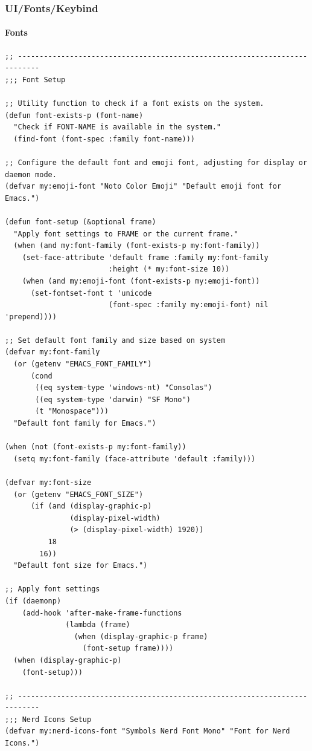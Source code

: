 \documentclass[11pt]{article}
\begin{document}
\subsubsection{UI/Fonts/Keybind}
\label{sec:orgcd0a7b3}
\paragraph{Fonts}
\label{sec:org087ad90}

\begin{verbatim}
;; ---------------------------------------------------------------------------
;;; Font Setup

;; Utility function to check if a font exists on the system.
(defun font-exists-p (font-name)
  "Check if FONT-NAME is available in the system."
  (find-font (font-spec :family font-name)))

;; Configure the default font and emoji font, adjusting for display or daemon mode.
(defvar my:emoji-font "Noto Color Emoji" "Default emoji font for Emacs.")

(defun font-setup (&optional frame)
  "Apply font settings to FRAME or the current frame."
  (when (and my:font-family (font-exists-p my:font-family))
    (set-face-attribute 'default frame :family my:font-family
                        :height (* my:font-size 10))
    (when (and my:emoji-font (font-exists-p my:emoji-font))
      (set-fontset-font t 'unicode
                        (font-spec :family my:emoji-font) nil 'prepend))))

;; Set default font family and size based on system
(defvar my:font-family
  (or (getenv "EMACS_FONT_FAMILY")
      (cond
       ((eq system-type 'windows-nt) "Consolas")
       ((eq system-type 'darwin) "SF Mono")
       (t "Monospace")))
  "Default font family for Emacs.")

(when (not (font-exists-p my:font-family))
  (setq my:font-family (face-attribute 'default :family)))

(defvar my:font-size
  (or (getenv "EMACS_FONT_SIZE")
      (if (and (display-graphic-p)
               (display-pixel-width)
               (> (display-pixel-width) 1920))
          18
        16))
  "Default font size for Emacs.")

;; Apply font settings
(if (daemonp)
    (add-hook 'after-make-frame-functions
              (lambda (frame)
                (when (display-graphic-p frame)
                  (font-setup frame))))
  (when (display-graphic-p)
    (font-setup)))

;; ---------------------------------------------------------------------------
;;; Nerd Icons Setup
(defvar my:nerd-icons-font "Symbols Nerd Font Mono" "Font for Nerd Icons.")


\end{verbatim}
\end{document}
